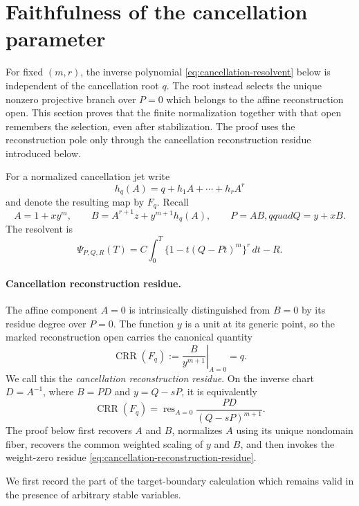 \section{Faithfulness of the cancellation parameter}
\label{sec:cancellation-parameter-faithfulness}

For fixed $(m,r)$, the inverse polynomial \eqref{eq:cancellation-resolvent}
below is independent of the cancellation root $q$.  The root instead selects
the unique nonzero projective branch over $P=0$ which belongs to the affine
reconstruction open.  This section proves that the finite normalization
together with that open remembers the selection, even after stabilization.
The proof uses the reconstruction pole only through the cancellation
reconstruction residue introduced below.

For a normalized cancellation jet write
\[
 h_q(A)=q+h_1A+\cdots+h_rA^r
\]
and denote the resulting map by $F_q$.  Recall
\[
 A=1+xy^m,\qquad
 B=A^{r+1}z+y^{m+1}h_q(A),\qquad P=AB,qquad Q=y+xB.
                                                               \tag{6.1}
\]
The resolvent is
\begin{equation}
 \Psi_{P,Q,R}(T)
 =C\int_0^T\{1-t(Q-Pt)^m\}^r\,dt-R.                 \tag{6.2}
 \label{eq:cancellation-resolvent}
\end{equation}

\paragraph{Cancellation reconstruction residue.}
The affine component $A=0$ is intrinsically distinguished from $B=0$ by its
residue degree over $P=0$.  The function $y$ is a unit at its generic point,
so the marked reconstruction open carries the canonical quantity
\[
 \operatorname{CRR}(F_q)
 :=\left.\frac{B}{y^{m+1}}\right|_{A=0}=q.              \tag{6.2a}
 \label{eq:cancellation-reconstruction-residue}
\]
We call this the \emph{cancellation reconstruction residue}.  On the inverse
chart $D=A^{-1}$, where $B=PD$ and $y=Q-sP$, it is equivalently
\[
 \operatorname{CRR}(F_q)
 =\operatorname{res}_{A=0}\frac{PD}{(Q-sP)^{m+1}}.
\]
The proof below first recovers $A$ and $B$, normalizes $A$ using its unique
nondomain fiber, recovers the common weighted scaling of $y$ and $B$, and
then invokes the weight-zero residue
\eqref{eq:cancellation-reconstruction-residue}.

We first record the part of the target-boundary calculation which remains
valid in the presence of arbitrary stable variables.

